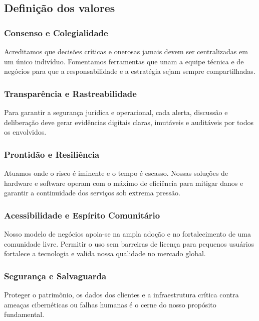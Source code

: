 \subsection{Definição dos valores}

\subsubsection{Consenso e Colegialidade}
Acreditamos que decisões críticas e onerosas jamais devem ser centralizadas em um único indivíduo. Fomentamos ferramentas que unam a equipe técnica e de negócios para que a responsabilidade e a estratégia sejam sempre compartilhadas.

\subsubsection{Transparência e Rastreabilidade}
Para garantir a segurança jurídica e operacional, cada alerta, discussão e deliberação deve gerar evidências digitais claras, imutáveis e auditáveis por todos os envolvidos.

\subsubsection{Prontidão e Resiliência}
Atuamos onde o risco é iminente e o tempo é escasso. Nossas soluções de hardware e software operam com o máximo de eficiência para mitigar danos e garantir a continuidade dos serviços sob extrema pressão.

\subsubsection{Acessibilidade e Espírito Comunitário}
Nosso modelo de negócios apoia-se na ampla adoção e no fortalecimento de uma comunidade livre. Permitir o uso sem barreiras de licença para pequenos usuários fortalece a tecnologia e valida nossa qualidade no mercado global.

\subsubsection{Segurança e Salvaguarda}
Proteger o patrimônio, os dados dos clientes e a infraestrutura crítica contra ameaças cibernéticas ou falhas humanas é o cerne do nosso propósito fundamental.  
